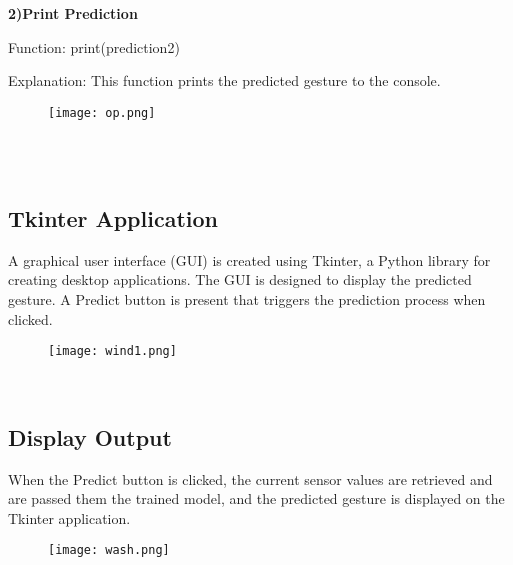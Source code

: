\documentclass[a4paper,12pt,oneside]{report}
\begin{document}
\par
\textbf{\large 2)Print Prediction}
\par
Function: print(prediction2)
\par
Explanation: This function prints the predicted gesture to the console.



\begin{figure}[h]
    \centering
    \begin{minipage}{0.5\textwidth}
        \centering
        \texttt{[image: op.png]}
        \label{fig:flex-sensor}
    \end{minipage}
\end{figure}

\\
\\
 \subsection{Tkinter Application}
 A graphical user interface (GUI) is created
using Tkinter, a Python library for creating desktop applications.
The GUI is designed to display the predicted gesture. A Predict
button is present that triggers the prediction process when clicked.
\begin{figure}[h]
    \centering
    \begin{minipage}{0.5\textwidth}
        \centering
        \texttt{[image: wind1.png]}
        \label{fig:flex-sensor}
    \end{minipage}
\end{figure}
\\

 \subsection{Display Output}
 When the Predict button is clicked, the current
sensor values are retrieved and are passed them the trained
model, and the predicted gesture is displayed on the Tkinter
application.
\begin{figure}[h]
    \centering
    \begin{minipage}{0.5\textwidth}
        \centering
        \texttt{[image: wash.png]}
        \label{fig:flex-sensor}
    \end{minipage}
\end{figure}
\\
\end{document}

